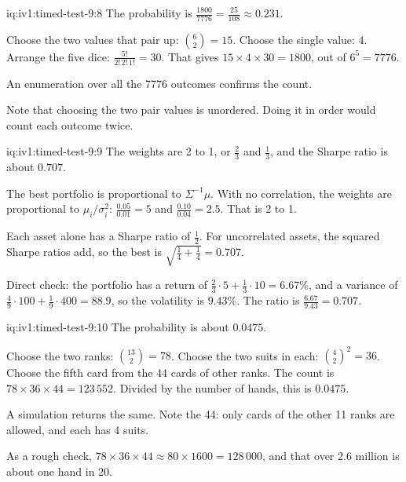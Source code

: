 \begin{solution}{iq:iv1:timed-test-9:8}
The probability is $\frac{1800}{7776} = \frac{25}{108} \approx 0.231$.

Choose the two values that pair up: $\binom62 = 15$. Choose the single value: 4. Arrange the five dice: $\frac{5!}{2!\,2!\,1!} = 30$. That gives $15 \times 4 \times 30 = 1800$, out of $6^5 = 7776$.

An enumeration over all the 7776 outcomes confirms the count.

Note that choosing the two pair values is unordered. Doing it in order would count each outcome twice.


\end{solution}

\begin{solution}{iq:iv1:timed-test-9:9}
The weights are 2 to 1, or $\frac23$ and $\frac13$, and the Sharpe ratio is about $0.707$.

The best portfolio is proportional to $\Sigma^{-1}\mu$. With no correlation, the weights are proportional to $\mu_i/\sigma_i^2$: $\frac{0.05}{0.01} = 5$ and $\frac{0.10}{0.04} = 2.5$. That is 2 to 1.

Each asset alone has a Sharpe ratio of $\frac12$. For uncorrelated assets, the squared Sharpe ratios add, so the best is $\sqrt{\frac14 + \frac14} = 0.707$.

Direct check: the portfolio has a return of $\frac23 \cdot 5 + \frac13 \cdot 10 = 6.67\%$, and a variance of $\frac49 \cdot 100 + \frac19 \cdot 400 = 88.9$, so the volatility is $9.43\%$. The ratio is $\frac{6.67}{9.43} = 0.707$.

\end{solution}

\begin{solution}{iq:iv1:timed-test-9:10}
The probability is about $0.0475$.

Choose the two ranks: $\binom{13}{2} = 78$. Choose the two suits in each: $\binom42^2 = 36$. Choose the fifth card from the 44 cards of other ranks. The count is $78 \times 36 \times 44 = 123\,552$. Divided by the number of hands, this is $0.0475$.

A simulation returns the same. Note the 44: only cards of the other 11 ranks are allowed, and each has 4 suits.

As a rough check, $78 \times 36 \times 44 \approx 80 \times 1600 = 128\,000$, and that over $2.6$ million is about one hand in 20.

\end{solution}

